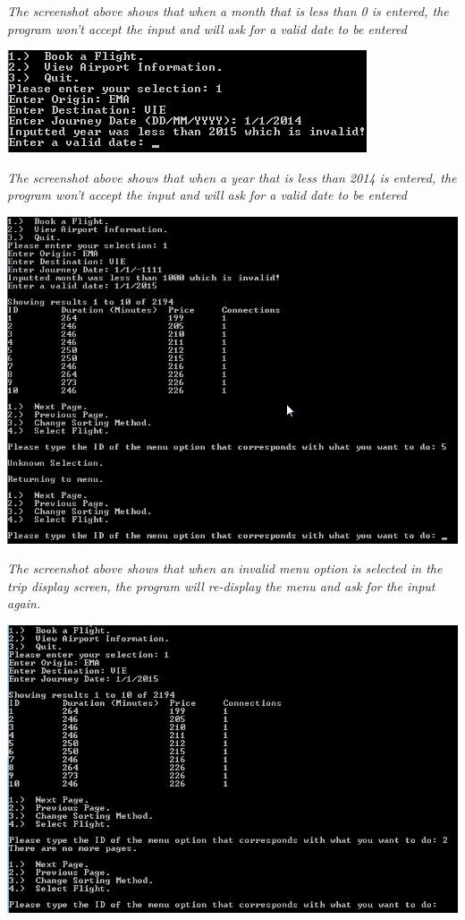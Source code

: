 \documentclass[10pt, a4paper]{article}
\begin{document}
\textit{The screenshot above shows that when a month that is less than 0 is entered, the program won't accept the input and will ask for a valid date to be entered}

\includegraphics{Validation14.png}

\textit{The screenshot above shows that when a year that is less than 2014 is entered, the program won't accept the input and will ask for a valid date to be entered}

\includegraphics{Validation15.png}

\textit{The screenshot above shows that when an invalid menu option is selected in the trip display screen, the program will re-display the menu and ask for the input again.}

\includegraphics{Validation16.png}
\end{document}
